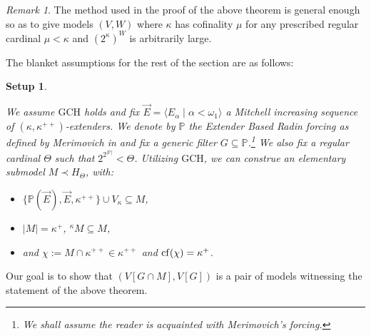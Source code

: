 \documentclass[11pt]{amsart}
\newtheorem{setup}{Setup}
\theoremstyle{definition}
\theoremstyle{remark}
\newtheorem{remark}[theorem]{Remark}
\DeclareMathOperator{\HOD}{HOD}
\newcommand{\cf}{{\rm cf}}
\def\s{\subseteq}
\begin{document}
\begin{remark}
    The method used in the proof of the above theorem is general enough so as to give models $(V,W)$ where $\kappa$ has cofinality $\mu$ for any prescribed regular cardinal $\mu<\kappa$ and $(2^\kappa)^{W}$ is arbitrarily large.

    \end{remark}



The blanket assumptions for the rest of the section are as follows:








\begin{setup}\label{ref: setup}
\rm{We assume  $\mathrm{GCH}$ holds and fix $\vec{E}= \langle E_\alpha \mid \alpha< \omega_1\rangle$  a Mitchell increasing sequence of $(\kappa,\kappa^{++})$-extenders. We denote by  $\mathbb{P}$ the  Extender Based Radin forcing as defined by Merimovich in \cite{Merimovich} and fix a generic filter $G\s \mathbb{P}$.\footnote{We shall assume the reader is acquainted with Merimovich's forcing.} We also fix  a regular cardinal $\Theta$ such that  $2^{2^{|\mathbb{P}|}}<\Theta$. Utilizing  $\mathrm{GCH}$, we can construe an elementary submodel $M\prec H_\Theta$, with:
\begin{itemize}
    \item $\{\mathbb{P}({\vec{E}}),\vec{E},\kappa^{++}\}\cup V_\kappa\s M$,
    \item $|M|=\kappa^{+}$, ${}^\kappa M\s M$,
    \item and $\chi:=M\cap \kappa^{++}\in \kappa^{++}$ and $\cf(\chi)=\kappa^+$.
\end{itemize}  }
\end{setup}


\smallskip

 Our goal is to show  that 
$(V[G\cap M], V[G])$
is a pair of models witnessing the statement of the above theorem. %
\end{document}
